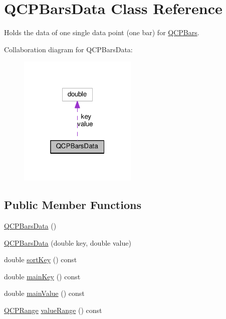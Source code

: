 \hypertarget{classQCPBarsData}{}\section{Q\+C\+P\+Bars\+Data Class Reference}
\label{classQCPBarsData}


Holds the data of one single data point (one bar) for \hyperlink{classQCPBars}{Q\+C\+P\+Bars}.  




Collaboration diagram for Q\+C\+P\+Bars\+Data\+:
\nopagebreak
\begin{figure}[H]
\begin{center}
\leavevmode
\includegraphics[width=160pt]{classQCPBarsData__coll__graph}
\end{center}
\end{figure}
\subsection*{Public Member Functions}
\begin{DoxyCompactItemize}
\item 
\hyperlink{classQCPBarsData_a800794d4c5fea22eeb8bade20798496b}{Q\+C\+P\+Bars\+Data} ()
\item 
\hyperlink{classQCPBarsData_a4158816a69e2c675885f48afa2b5acc9}{Q\+C\+P\+Bars\+Data} (double key, double value)
\item 
double \hyperlink{classQCPBarsData_aec71a3f55d0d52192ff9ad85b04ebf8d}{sort\+Key} () const 
\item 
double \hyperlink{classQCPBarsData_a8d9c33934d75e11d6e205981a4e4b11d}{main\+Key} () const 
\item 
double \hyperlink{classQCPBarsData_a0ee3c777e5df7d5f5f63fe82539845d5}{main\+Value} () const 
\item 
\hyperlink{classQCPRange}{Q\+C\+P\+Range} \hyperlink{classQCPBarsData_a87e9dc820e4b306da4dbec1a993bec14}{value\+Range} () const 
\end{DoxyCompactItemize}
